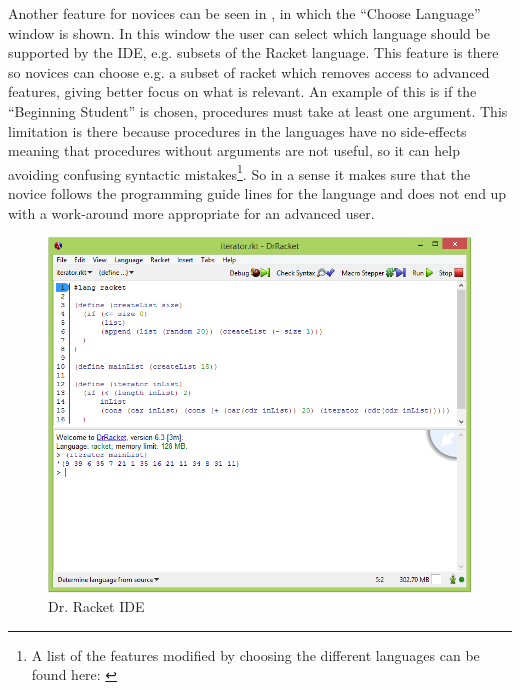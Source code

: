 Another feature for novices can be seen in , in which the ``Choose Language'' window is shown. In this window the user can select which language should be supported by the IDE, e.g. subsets of the Racket language. This feature is there so novices can choose e.g. a subset of racket which removes access to advanced features, giving better focus on what is relevant. An example of this is if the ``Beginning Student'' is chosen, procedures must take at least one argument. This limitation is there because procedures in the languages have no side-effects meaning that procedures without arguments are not useful, so it can help avoiding confusing syntactic mistakes\cite{dr_racket_languages}\footnote{A list of the features modified by choosing the different languages can be found here: \cite{dr_racket_languages}}. So in a sense it makes sure that the novice follows the programming guide lines for the language and does not end up with a work-around more appropriate for an advanced user.

\begin{figure}[H]
\begin{center}
\includegraphics[scale=0.59]{./pics/drracket.png}
\caption{Dr. Racket IDE}
\label{fig:dr_racket}
\end{center}
\end{figure}

